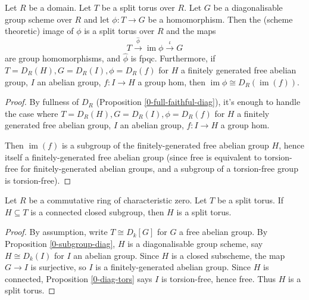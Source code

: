 \begin{proposition}
  \label{1-1-1-group-hom-torus} %

  Let $R$ be a domain. Let $T$ be a split torus over $R$.
  Let $G$ be a diagonalisable group scheme over $R$ and let $\phi: T \to G$ be a homomorphism.
  Then the (scheme theoretic) image of $\phi$ is a split torus over $R$ and the maps
  \[
    T \xrightarrow{\hat{\phi}} \operatorname{im}\phi \xrightarrow{\iota} G
  \]
  are group homomorphisms, and $\hat{\phi}$ is fpqc.
  Furthermore, if $T = D_R(H), G = D_R(I), \phi = D_R(f)$
  for $H$ a finitely generated free abelian group, $I$ an abelian group, $f : I \to H$ a group hom,
  then $\operatorname{im} \phi \cong D_R(\operatorname{im}(f))$.
\end{proposition}
\begin{proof}

  By fullness of $D_R$ (Proposition \ref{0-full-faithful-diag}),
  it's enough to handle the case where $T = D_R(H), G = D_R(I), \phi = D_R(f)$
  for $H$ a finitely generated free abelian group, $I$ an abelian group, $f : I \to H$ a group hom.

  Then $\operatorname{im}(f)$ is a subgroup of the finitely-generated free abelian group $H$,
  hence itself a finitely-generated free abelian group
  (since free is equivalent to torsion-free for finitely-generated abelian groups,
  and a subgroup of a torsion-free group is torsion-free).
\end{proof}


\begin{proposition}
  \label{1-1-1-subgroup-torus}

  Let $R$ be a commutative ring of characteristic zero.
  Let $T$ be a split torus.
  If $H \subseteq T$ is a connected closed subgroup, then $H$ is a split torus.
\end{proposition}
\begin{proof}

  By assumption, write $T \cong D_k[G]$ for $G$ a free abelian group.
  By Proposition \ref{0-subgroup-diag}, $H$ is a diagonalisable group scheme,
  say $H \cong D_k(I)$ for $I$ an abelian group.
  Since $H$ is a closed subscheme, the map $G \to I$ is surjective,
  so $I$ is a finitely-generated abelian group.
  Since $H$ is connected, Proposition \ref{0-diag-tors} says $I$ is torsion-free, hence free.
  Thus $H$ is a split torus.
\end{proof}


